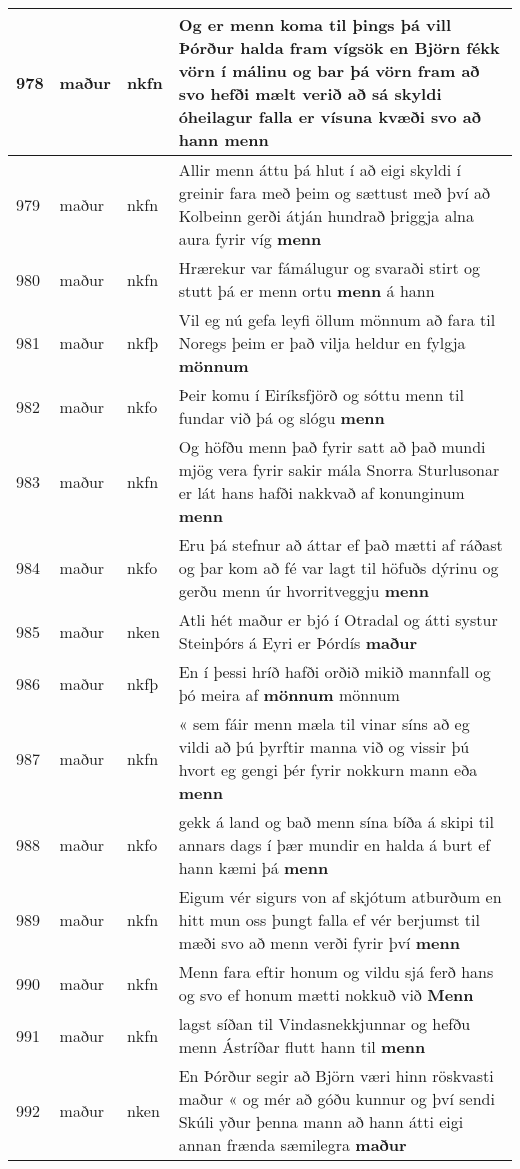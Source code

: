 \documentclass{article}
\begin{document}
\begin{longtable}{p{1cm}|p{1cm}|p{1cm}|p{13cm}}
\hline
978&maður&nkfn&Og er menn koma til þings þá vill Þórður halda fram vígsök en Björn fékk vörn í málinu og bar þá vörn fram að svo hefði mælt verið að sá skyldi óheilagur falla er vísuna kvæði svo að hann \textbf{menn} \\
\hline
979&maður&nkfn&Allir menn áttu þá hlut í að eigi skyldi í greinir fara með þeim og sættust með því að Kolbeinn gerði átján hundrað þriggja alna aura fyrir víg \textbf{menn} \\
\hline
980&maður&nkfn&Hrærekur var fámálugur og svaraði stirt og stutt þá er menn ortu \textbf{menn} á hann\\
\hline
981&maður&nkfþ&Vil eg nú gefa leyfi öllum mönnum að fara til Noregs þeim er það vilja heldur en fylgja \textbf{mönnum} \\
\hline
982&maður&nkfo&Þeir komu í Eiríksfjörð og sóttu menn til fundar við þá og slógu \textbf{menn} \\
\hline
983&maður&nkfn&Og höfðu menn það fyrir satt að það mundi mjög vera fyrir sakir mála Snorra Sturlusonar er lát hans hafði nakkvað af konunginum \textbf{menn} \\
\hline
984&maður&nkfo&Eru þá stefnur að áttar ef það mætti af ráðast og þar kom að fé var lagt til höfuðs dýrinu og gerðu menn úr hvorritveggju \textbf{menn} \\
\hline
985&maður&nken&Atli hét maður er bjó í Otradal og átti systur Steinþórs á Eyri er Þórdís \textbf{maður} \\
\hline
986&maður&nkfþ&En í þessi hríð hafði orðið mikið mannfall og þó meira af \textbf{mönnum} mönnum\\
\hline
987&maður&nkfn&« sem fáir menn mæla til vinar síns að eg vildi að þú þyrftir manna við og vissir þú hvort eg gengi þér fyrir nokkurn mann eða \textbf{menn} \\
\hline
988&maður&nkfo&gekk á land og bað menn sína bíða á skipi til annars dags í þær mundir en halda á burt ef hann kæmi þá \textbf{menn} \\
\hline
989&maður&nkfn&Eigum vér sigurs von af skjótum atburðum en hitt mun oss þungt falla ef vér berjumst til mæði svo að menn verði fyrir því \textbf{menn} \\
\hline
990&maður&nkfn&Menn fara eftir honum og vildu sjá ferð hans og svo ef honum mætti nokkuð við \textbf{Menn} \\
\hline
991&maður&nkfn&lagst síðan til Vindasnekkjunnar og hefðu menn Ástríðar flutt hann til \textbf{menn} \\
\hline
992&maður&nken&En Þórður segir að Björn væri hinn röskvasti maður « og mér að góðu kunnur og því sendi Skúli yður þenna mann að hann átti eigi annan frænda sæmilegra \textbf{maður} \\

\end{longtable}
\end{document}
